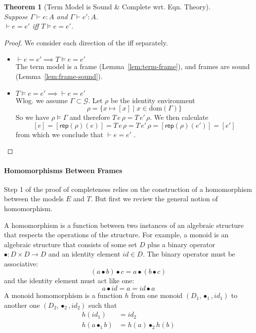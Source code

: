 \documentclass{tufte-handout}
\newtheorem{theorem}{Theorem}%
\begin{document}
\begin{theorem}[Term Model is Sound \& Complete wrt. Eqn. Theory]\ \\
  \label{thm:term-sound-complete}
  Suppose $\Gamma \vdash e : A$ and $\Gamma \vdash e' : A$.\\
  $\vdash e = e'$ iff $T \models e = e'$.
\end{theorem}
\begin{proof}
  We consider each direction of the iff separately.
  \begin{itemize}
  \item $\vdash e = e' \implies T \models e = e'$ \\
    The term model is a frame (Lemma~\ref{lem:term-frame}),
    and frames are sound (Lemma~\ref{lem:frame-sound}).
  \item $T \models e = e' \implies \vdash e = e'$ \\
    Wlog. we assume $\Gamma \subset \mathcal{G}$.
    Let $\rho$ be the identity environment
    \[
    \rho = \{ x \mapsto [x] \mid x \in \mathrm{dom}(\Gamma) \}
    \]
    So we have $\rho \models \Gamma$
    and therefore $T\,e\,\rho = T\,e'\,\rho$. We then calculate
    \[
      [e]
      = [\mathsf{rep}(\rho)(e)]
      = T\,e\,\rho
      = T\,e'\,\rho
      = [\mathsf{rep}(\rho)(e')]
      = [e']
    \]
    from which we conclude that $\vdash e = e'$ .
    
  \end{itemize}
  
\end{proof}




\paragraph{Homomorphisms Between Frames}

Step 1 of the proof of completeness relies on the construction of a
homomorphism between the models $E$ and $T$. But first we review the
general notion of homomorphism.

A homomorphism is a function between two instances of an algebraic
structure that respects the operations of the structure. For example,
a monoid is an algebraic structure that consists of some set $D$ plus
a binary operator $\bullet : D \times D \to D$ and an identity element
$\mathit{id} \in D$. The binary operator must be associative:
\[
(a \bullet b) \bullet c = a \bullet (b \bullet c)
\]
and the identity element must act like one:
\[
  a \bullet \mathit{id} = a = \mathit{id} \bullet a
\]
A monoid homomorphism is a function $h$ from one monoid
$(D_1,\bullet_1,\mathit{id}_1)$ to another one
$(D_2,\bullet_2,\mathit{id}_2)$ such that
\begin{align*}
  h(\mathit{id}_1) &= \mathit{id}_2 \\
  h(a \bullet_1 b) &= h(a) \bullet_2 h(b) 
\end{align*}
\end{document}
